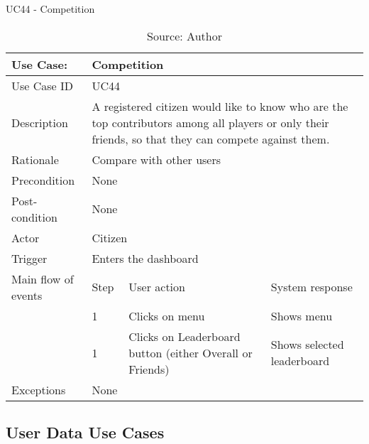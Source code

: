 \begin{table}[h]
\centering
\caption{UC44 - Competition}
\label{uc:44}
\begin{tabular}{|p{3cm}|p{1cm}|p{5cm}|p{5cm}|}
\hline
Use Case:       & \multicolumn{3}{p{11cm}|}{Competition} \\ \hline
Use Case ID     & \multicolumn{3}{p{11cm}|}{UC44} \\ \hline
Description     & \multicolumn{3}{p{11cm}|}{A registered citizen would like to know who are the top contributors among all players or only their friends, so that they can compete against them.} \\ \hline
Rationale       & \multicolumn{3}{p{11cm}|}{Compare with other users} \\ \hline
Precondition    & \multicolumn{3}{p{11cm}|}{None} \\ \hline
Post-condition  & \multicolumn{3}{p{11cm}|}{None} \\ \hline
Actor           & \multicolumn{3}{p{11cm}|}{Citizen} \\ \hline
Trigger         & \multicolumn{3}{p{11cm}|}{Enters the dashboard} \\ \hline
Main flow of events & Step  & User action & System response \\ \hline
                    & 1     & Clicks on menu & Shows menu \\ \hline
                    & 1     & Clicks on Leaderboard button (either Overall or Friends) & Shows selected leaderboard \\ \hline
Exceptions      & \multicolumn{3}{p{11cm}|}{None} \\ \hline
\end{tabular}
\caption*{Source: Author}
\end{table}

\clearpage
\subsection{User Data Use Cases}

